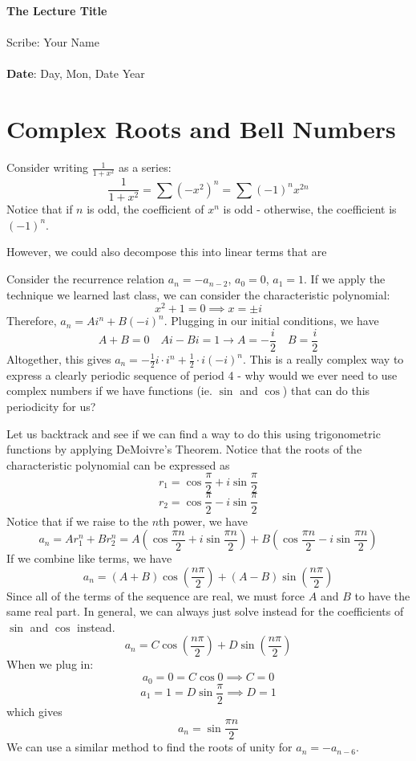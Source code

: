 \documentclass[11pt,twosided]{article}
\def\titlestring{The Lecture Title}
\def\scribestring{Your Name}
\def\datestring{Day, Mon, Date Year}
\begin{document}
\thispagestyle{plain}  %

\noindent
{\LARGE \textbf{\titlestring}}\\\\
%
{\Large Scribe: \scribestring}\\ \\
{\textbf{Date}: \datestring}


\noindent

\section{Complex Roots and Bell Numbers}
Consider writing $\frac{1}{1+x^2}$ as a series: 
\[
	\frac{1}{1+x^2} = \sum (-x^2)^n = \sum (-1)^n x^{2n}
\]
Notice that if $n$ is odd, the coefficient of $x^n$ is odd - otherwise, the coefficient is $(-1)^n$. 

However, we could also decompose this into linear terms that are 

Consider the recurrence relation $a_n = -a_{n-2}$, $a_0 = 0$, $a_1 = 1$. If we apply the technique we learned last class, we can consider the characteristic polynomial: 
\[
	x^2 + 1 = 0 \implies x = \pm i
\]
Therefore, $a_n = Ai^n + B(-i)^n$. Plugging in our initial conditions, we have 
\[
	A + B = 0 \quad Ai - Bi = 1 \rightarrow A = -\frac{i}{2} \quad B = \frac{i}{2}
\]
Altogether, this gives $a_n = -\frac{1}{2}i\cdot i^n + \frac{1}{2} \cdot i(-i)^n$. This is a really complex way to express a clearly periodic sequence of period 4 - why would we ever need to use complex numbers if we have functions (ie. $\sin$ and $\cos$) that can do this periodicity for us? 

Let us backtrack and see if we can find a way to do this using trigonometric functions by applying DeMoivre's Theorem. Notice that the roots of the characteristic polynomial can be expressed as
\[
	r_1 = \cos \frac{\pi}{2} + i \sin \frac{\pi}{2} 	
\]
\[
	r_2 = \cos \frac{\pi}{2} - i \sin \frac{\pi}{2} 	
\]
Notice that if we raise to the $n$th power, we have
\[
	a_n = Ar_1^n + Br_2^n = A\left( \cos \frac{\pi n}{2} + i \sin \frac{\pi n}{2} \right) + B\left( \cos \frac{\pi n}{2} - i \sin \frac{\pi n}{2} 	\right) 
\]
If we combine like terms, we have
\[
	a_n = (A+B) \cos \left(\frac{n \pi}{2} \right) + (A-B) \sin \left(\frac{n \pi}{2} \right)
\]
Since all of the terms of the sequence are real, we must force $A$ and $B$ to have the same real part. In general, we can always just solve instead for the coefficients of $\sin$ and $\cos$ instead. 
\[
	a_n = C \cos \left(\frac{n \pi}{2} \right) + D \sin \left(\frac{n \pi}{2} \right)
\]
When we plug in: 
\[
	a_0 = 0 = C \cos 0 \implies C = 0
\]
\[
	a_1 = 1 = D \sin \frac{\pi}{2} \implies D = 1
\]
which gives 
\[
	a_n = \sin \frac{\pi n}{2} 
\]
We can use a similar method to find the roots of unity for $a_n = - a_{n-6}$. 
\end{document}
